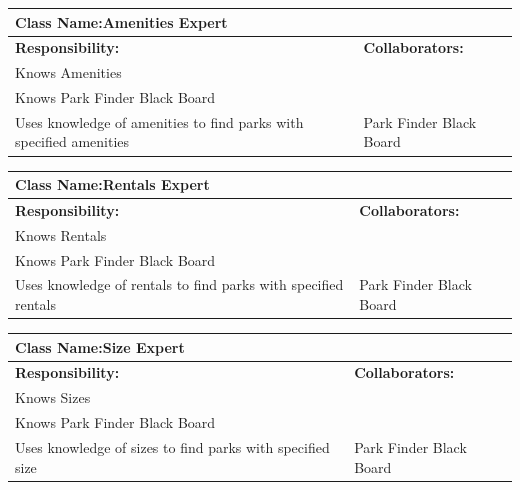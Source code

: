 \documentclass[titlepage,12pt]{article}
\begin{document}
 				\begin{table}[H]
 					\centering
 					\begin{tabular}{|p{5cm}|p{5cm}|}
 						\hline 
 						\multicolumn{2}{|l|}{\textbf{Class Name:Amenities Expert}} \\
 						\hline
 						\textbf{Responsibility:} & \textbf{Collaborators:} \\
 						\hline
 						Knows Amenities & \\
 						\hline
 						Knows Park Finder Black Board & \\
 						\hline
 						Uses knowledge of amenities to find parks with specified amenities  &	Park Finder Black Board \\
 						\hline
 					\end{tabular}
 				\end{table}	
 				
 				
 				\begin{table}[H]
 					\centering
 					\begin{tabular}{|p{5cm}|p{5cm}|}
 						\hline 
 						\multicolumn{2}{|l|}{\textbf{Class Name:Rentals Expert}} \\
 						\hline
 						\textbf{Responsibility:} & \textbf{Collaborators:} \\
 						\hline
 						Knows Rentals & \\
 						\hline
 						Knows Park Finder Black Board & \\
 						\hline
 						Uses knowledge of rentals to find parks with specified rentals &	Park Finder Black Board \\
 						\hline
 					\end{tabular}
 				\end{table}	
 				
 				\begin{table}[H]
 					\centering
 					\begin{tabular}{|p{5cm}|p{5cm}|}
 						\hline 
 						\multicolumn{2}{|l|}{\textbf{Class Name:Size Expert}} \\
 						\hline
 						\textbf{Responsibility:} & \textbf{Collaborators:} \\
 						\hline
 						Knows Sizes & \\
 						\hline
 						Knows Park Finder Black Board & \\
 						\hline
 						Uses knowledge of sizes to find parks with specified size &	Park Finder Black Board \\
 						\hline
 					\end{tabular}
 				\end{table}	
 				
\end{document}
